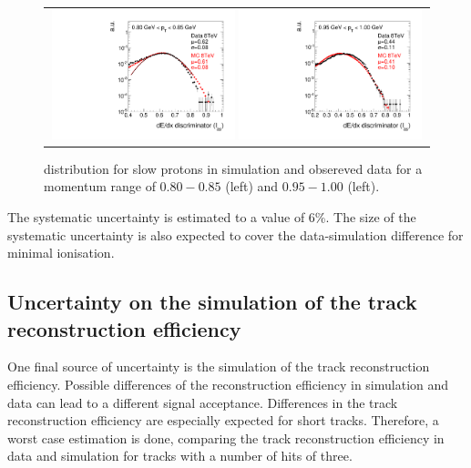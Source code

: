 \begin{figure}[!h]
  \centering 
  \begin{tabular}{c}
    \includegraphics[width=0.49\textwidth]{figures/analysis/Interpretation/hIas_analysis_2015_11_30_ForThesis_ptmin0p80_ptmax0p85.pdf} 
    \includegraphics[width=0.49\textwidth]{figures/analysis/Interpretation/hIas_analysis_2015_11_30_ForThesis_ptmin0p95_ptmax1p0.pdf}
  \end{tabular}
  \caption{\ias distribution for slow protons in simulation and obsereved data for a momentum range of $0.80-0.85$ (left) and $0.95-1.00$ (left).}
  \label{fig:IasSlowProtons}
\end{figure} 
The systematic uncertainty is estimated to a value of 6\%.
The size of the systematic uncertainty is also expected to cover the data-simulation difference for minimal ionisation.


\subsection*{Uncertainty on the simulation of the track reconstruction efficiency}
One final source of uncertainty is the simulation of the track reconstruction efficiency.
Possible differences of the reconstruction efficiency in simulation and data can lead to a different signal acceptance.
Differences in the track reconstruction efficiency are especially expected for short tracks.
Therefore, a worst case estimation is done, comparing the track reconstruction efficiency in data and simulation for tracks with a number of hits of three.


